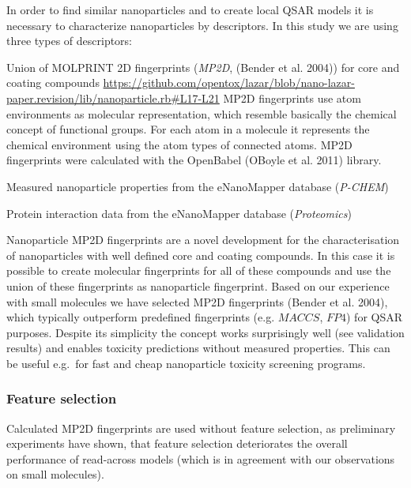 \documentclass[utf8]{frontiersHLTH} %
\makeatletter
\providecommand{\tightlist}{%
  \setlength{\itemsep}{0pt}\setlength{\parskip}{0pt}}
\newenvironment{description}
	{\list{}{\labelwidth\z@ \itemindent-\leftmargin
		\let\makelabel\descriptionlabel}}
	{\endlist}
\newcommand*\descriptionlabel[1]{\hspace\labelsep
	\normalfont\bfseries #1}
\makeatother
\begin{document}
In order to find similar nanoparticles and to create local QSAR models
it is necessary to characterize nanoparticles by descriptors. In this
study we are using three types of descriptors:

\begin{description}
\tightlist
\item[Structural descriptors]
Union of MOLPRINT 2D fingerprints (\emph{MP2D}, (Bender et al. 2004))
for core and coating compounds
\url{https://github.com/opentox/lazar/blob/nano-lazar-paper.revision/lib/nanoparticle.rb\#L17-L21}
MP2D fingerprints use atom environments as molecular representation,
which resemble basically the chemical concept of functional groups. For
each atom in a molecule it represents the chemical environment using the
atom types of connected atoms. MP2D fingerprints were calculated with
the OpenBabel (OBoyle et al. 2011) library.
\item[Physico-chemical nanoparticle properties]
Measured nanoparticle properties from the eNanoMapper database
(\emph{P-CHEM})
\item[Biological nanoparticle properties]
Protein interaction data from the eNanoMapper database
(\emph{Proteomics})
\end{description}

Nanoparticle MP2D fingerprints are a novel development for the
characterisation of nanoparticles with well defined core and coating
compounds. In this case it is possible to create molecular fingerprints
for all of these compounds and use the union of these fingerprints as
nanoparticle fingerprint. Based on our experience with small molecules
we have selected MP2D fingerprints (Bender et al. 2004), which typically
outperform predefined fingerprints (e.g. \(MACCS\), \(FP4\)) for QSAR
purposes. Despite its simplicity the concept works surprisingly well
(see validation results) and enables toxicity predictions without
measured properties. This can be useful e.g.~for fast and cheap
nanoparticle toxicity screening programs.

\subsubsection{Feature selection}\label{feature-selection}

Calculated MP2D fingerprints are used without feature selection, as
preliminary experiments have shown, that feature selection deteriorates
the overall performance of read-across models (which is in agreement
with our observations on small molecules).
\end{document}
